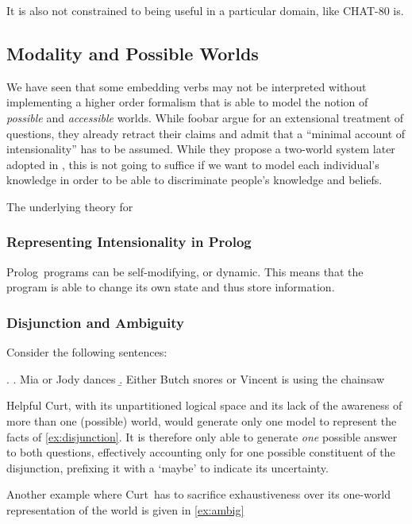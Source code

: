 \documentclass[12pt,a4paper]{article}
\newcommand{\pn}{\textsf} %
\newcommand{\curt}{\pn{Curt}\mbox{ }}
\newcommand{\prol}{\pn{Prolog}\mbox{ }}
\theoremstyle{remark} \newtheorem*{termin}{Definition} %
\begin{document}
It is also not constrained to being useful in a particular domain, like
\pn{CHAT-80} is.

\subsection{Modality and Possible Worlds}
\label{sec:indices}

We have seen that some embedding verbs may not be interpreted without
implementing a higher order formalism that is able to model the notion of
\emph{possible} and \emph{accessible} worlds. While foobar %
argue for an extensional treatment of questions, they already %
retract their claims and admit that a ``minimal account of intensionality'' has
to be assumed. While they propose a two-world system later adopted in
\cite{g:is}, this is not going to suffice if we want to model each individual's
knowledge in order to be able to discriminate people's knowledge and beliefs.

The underlying theory for 

\subsubsection{Representing Intensionality in \prol}

\prol programs can be self-modifying, or dynamic. This means that the program is
able to change its own state and thus store information. 

\subsubsection{Disjunction and Ambiguity}
Consider the following sentences:

\ex. \label{ex:disjunction} \a. Mia or Jody dances
\b. Either Butch snores or Vincent is using the chainsaw

\pn{Helpful Curt}, with its unpartitioned logical space and its lack of
the awareness of more than one (possible) world, would generate only one model
to represent the facts of \ref{ex:disjunction}. It is therefore only able to
generate \emph{one} possible answer to both questions, effectively accounting only
for one possible constituent of the disjunction, prefixing it with a `maybe' to
indicate its uncertainty.

Another example where \curt has to sacrifice exhaustiveness over its one-world
representation of the world is given in \ref{ex:ambig}
\end{document}
